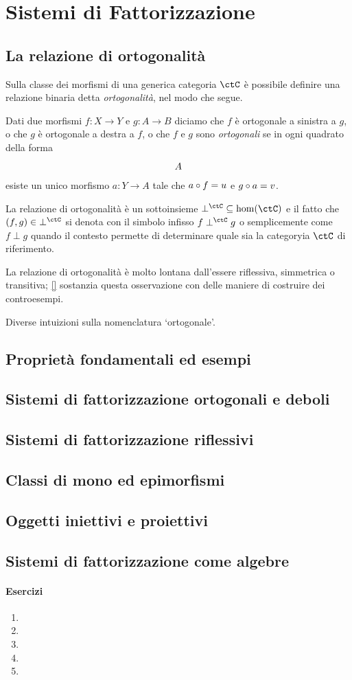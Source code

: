 \chapter{Sistemi di Fattorizzazione}
\section[Ortogonalità]{La relazione di ortogonalità}
Sulla classe dei morfismi di una generica categoria $\ctC$ è possibile definire una relazione binaria detta \emph{ortogonalità}, nel modo che segue.
\begin{definition}
        Dati due morfismi $f : X\to Y$ e $g : A\to B$ diciamo che $f$ è ortogonale a sinistra a $g$, o che $g$ è ortogonale a destra a $f$, o che \(f\) e \(g\) sono \emph{ortogonali} se in ogni quadrato della forma
    \[
    \vcenter{\xymatrix{%
      A
    }}\]
        esiste un unico morfismo $a : Y\to A$ tale che $a\circ f=u$ e $g\circ a=v$.
\end{definition}
La relazione di ortogonalità è un sottoinsieme $\mathbin{\perp^\ctC} \subseteq \hom(\ctC)$ e il fatto che $(f,g)\in \mathbin{\perp^\ctC}$ si denota con il simbolo infisso $f\perp^\ctC g$ o semplicemente come $f\perp g$ quando il contesto permette di determinare quale sia la categoryia \(\ctC\) di riferimento.

La relazione di ortogonalità è molto lontana dall'essere riflessiva, simmetrica o transitiva; \autoref{} sostanzia questa osservazione con delle maniere di costruire dei controesempi.
\begin{remark}\label{perche_ortogonale}
Diverse intuizioni sulla nomenclatura `ortogonale'.
\end{remark}

\section[Proprietà ed esempi]{Proprietà fondamentali ed esempi}
\section[Fattorizzazione]{Sistemi di fattorizzazione ortogonali e deboli}
\section[Riflessività]{Sistemi di fattorizzazione riflessivi}
\section[Mono ed epimorfismi]{Classi di mono ed epimorfismi}
\section[Iniettivi e proiettivi]{Oggetti iniettivi e proiettivi}
\section[Fattorizzazione e algebre]{Sistemi di fattorizzazione come algebre}
\subsubsection*{Esercizi}
\begin{enumerate}
    \item
    \item
    \item
    \item
    \item
\end{enumerate}
